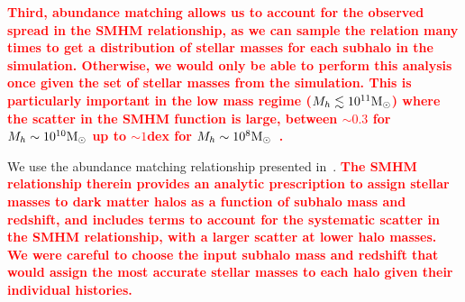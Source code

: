 \documentclass[linenumbers,twocolumn]{aastex631}
\newcommand{\add}[1]{\textcolor{red}{\textbf{#1}}}
\begin{document}
    \add{Third, abundance matching allows us to account for the observed spread in the SMHM relationship, as we can sample the relation many times to get a distribution of stellar masses for each subhalo in the simulation. Otherwise, we would only be able to perform this analysis once given the set of stellar masses from the simulation. 
    This is particularly important in the low mass regime ($M_h \lesssim 10^{11}\mathrm{M}_\odot$) where the scatter in the SMHM function is large, between $\sim 0.3$ for $M_{h}\sim 10^{10}\mathrm{M}_\odot$ up to $\sim 1$dex for $M_{h}\sim10^{8}\mathrm{M}_\odot$~\citep{Munshi2021}. }
    

    
    We use the abundance matching relationship presented in~\citet{Moster2013}.
    \add{The SMHM relationship therein provides an analytic prescription to assign stellar masses to dark matter halos as a function of subhalo mass and redshift, and includes terms to account for the systematic scatter in the SMHM relationship, with a larger scatter at lower halo masses.
    We were careful to choose the input subhalo mass and redshift that would assign the most accurate stellar masses to each halo given their individual histories.}
    
\end{document}
